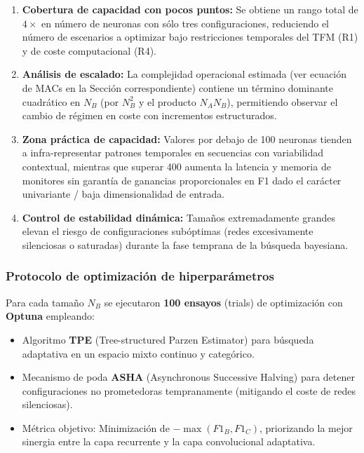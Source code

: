 \begin{enumerate}
    \item \textbf{Cobertura de capacidad con pocos puntos:} Se obtiene un rango total de $4\times$ en número de neuronas con sólo tres configuraciones, reduciendo el número de escenarios a optimizar bajo restricciones temporales del TFM (R1) y de coste computacional (R4).
    \item \textbf{Análisis de escalado:} La complejidad operacional estimada (ver ecuación de MACs en la Sección correspondiente) contiene un término dominante cuadrático en $N_B$ (por $N_B^2$ y el producto $N_A N_B$), permitiendo observar el cambio de régimen en coste con incrementos estructurados.
    \item \textbf{Zona práctica de capacidad:} Valores por debajo de 100 neuronas tienden a infra-representar patrones temporales en secuencias con variabilidad contextual, mientras que superar 400 aumenta la latencia y memoria de monitores sin garantía de ganancias proporcionales en F1 dado el carácter univariante / baja dimensionalidad de entrada.
    \item \textbf{Control de estabilidad dinámica:} Tamaños extremadamente grandes elevan el riesgo de configuraciones subóptimas (redes excesivamente silenciosas o saturadas) durante la fase temprana de la búsqueda bayesiana.
\end{enumerate}

\subsubsection{Protocolo de optimización de hiperparámetros}
Para cada tamaño $N_B$ se ejecutaron \textbf{100 ensayos} (trials) de optimización con \textbf{Optuna} empleando:
\begin{itemize}
    \item Algoritmo \textbf{TPE} (Tree-structured Parzen Estimator) para búsqueda adaptativa en un espacio mixto continuo y categórico.
    \item Mecanismo de poda \textbf{ASHA} (Asynchronous Successive Halving) para detener configuraciones no prometedoras tempranamente (mitigando el coste de redes silenciosas).
    \item Métrica objetivo: Minimización de $-\max(F1_B, F1_C)$, priorizando la mejor sinergia entre la capa recurrente y la capa convolucional adaptativa.
\end{itemize}

